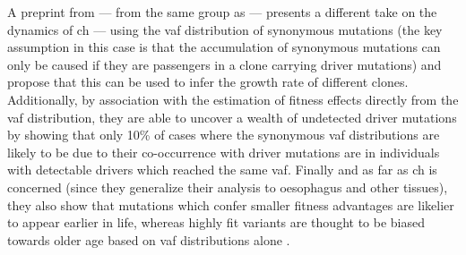 A preprint from  --- from the same group as \cite{Watson2020-pz} --- presents a different take on the dynamics of \ac{ch} --- using the \ac{vaf} distribution of synonymous mutations (the key assumption in this case is that the accumulation of synonymous mutations can only be caused if they are passengers in a clone carrying driver mutations) and propose that this can be used to infer the growth rate of different clones. Additionally, by association with the estimation of fitness effects directly from the \ac{vaf} distribution, they are able to uncover a wealth of undetected driver mutations by showing that only 10\% of cases where the synonymous \ac{vaf} distributions are likely to be due to their co-occurrence with driver mutations are in individuals with detectable drivers which reached the same \ac{vaf}. Finally and as far as \ac{ch} is concerned (since they generalize their analysis to oesophagus and other tissues), they also show that mutations which confer smaller fitness advantages are likelier to appear earlier in life, whereas highly fit variants are thought to be biased towards older age based on \ac{vaf} distributions alone \cite{Poon2020-ek}.

